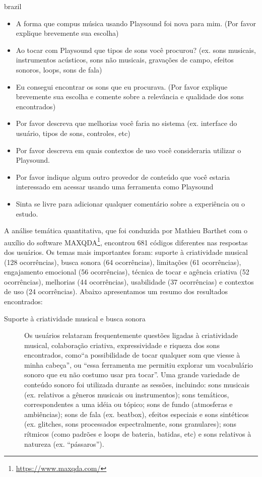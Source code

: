 \begin{otherlanguage*}{brazil}
\begin{itemize}
\item A forma que compus música usando Playsound foi nova para mim. (Por favor explique brevemente sua escolha)

\item Ao tocar com Playsound que tipos de sons você procurou? (ex. sons musicais, instrumentos acústicos, sons não musicais, gravações de campo, efeitos sonoros, loops, sons de fala)

\item Eu consegui encontrar os sons que eu procurava. (Por favor explique brevemente sua escolha e comente sobre a relevância e qualidade dos sons encontrados)

\item Por favor descreva que melhorias você faria no sistema (ex. interface do usuário, tipos de sons, controles, etc)

\item Por favor descreva em quais contextos de uso você consideraria utilizar o Playsound.

\item Por favor indique algum outro provedor de conteúdo que você estaria interessado em acessar usando uma ferramenta como Playsound

\item Sinta se livre para adicionar qualquer comentário sobre a experiência ou o estudo.

\end{itemize}

A análise temática quantitativa, que foi conduzida por Mathieu Barthet com o auxílio do software MAXQDA\footnote{\url{https://www.maxqda.com/}}, encontrou 681 códigos diferentes nas respostas dos usuários. Os temas mais importantes foram: suporte à criatividade musical (128 ocorrências), busca sonora (64 ocorrências), limitações (61 ocorrências), engajamento emocional (56 ocorrências), técnica de tocar e agência criativa (52 ocorrências), melhorias (44 ocorrências), usabilidade (37 ocorrências) e contextos de uso (24 ocorrências). Abaixo apresentamos um resumo dos resultados encontrados:

\begin{description}
\item[Suporte à criatividade musical e busca sonora] Os usuários relataram frequentemente questões ligadas à criatividade musical, colaboração criativa, expressividade e riqueza dos sons encontrados, como``a possibilidade de tocar qualquer som que viesse à minha cabeça'', ou ``essa ferramenta me permitiu explorar um vocabulário sonoro que eu não costumo usar pra tocar''. Uma grande variedade de conteúdo sonoro foi utilizada durante as sessões, incluindo: sons musicais (ex. relativos a gêneros musicais ou instrumentos); sons temáticos, correspondentes a uma idéia ou tópico; sons de fundo (atmosferas e ambiências); sons de fala (ex. beatbox), efeitos especiais e sons sintéticos (ex. glitches, sons processados espectralmente, sons granulares); sons rítmicos (como padrões e loops de bateria, batidas, etc) e sons relativos à natureza (ex. ``pássaros'').


\end{description}
\end{otherlanguage*}
